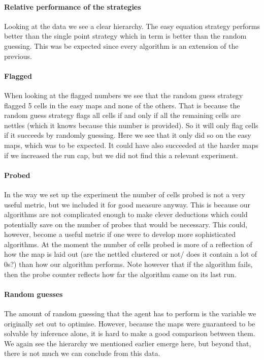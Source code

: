 \documentclass[british]{article}
\begin{document}
\paragraph{Relative performance of the strategies} Looking at the data we see a clear hierarchy. The easy equation strategy performs better than the single point strategy which in term is better than the random guessing. This was be expected since every algorithm is an extension of the previous.  

\paragraph{Flagged} When looking at the flagged numbers we see that the random guess strategy flagged 5 cells in the easy maps and none of the others. That is because the random guess strategy flags all cells if and only if all the remaining cells are nettles (which it knows because this number is provided). So it will only flag cells if it succeeds by randomly guessing. Here we see that it only did so on the easy maps, which was to be expected. It could have also succeeded at the harder maps if we increased the run cap, but we did not find this a relevant experiment.

\paragraph{Probed} In the way we set up the experiment the number of cells probed is not a very useful metric, but we included it for good measure anyway. This is because our algorithms are not complicated enough to make clever deductions which could potentially save on the number of probes that would be necessary. This could, however, become a useful metric if one were to develop more sophisticated algorithms. At the moment the number of cells probed is more of a reflection of how the map is laid out (are the nettled clustered or not/ does it contain a lot of 0s?) than how our algorithm performs. Note however that if the algorithm fails, then the probe counter reflects how far the algorithm came on its last run. 

\paragraph{Random guesses} The amount of random guessing that the agent has to perform is the variable we originally set out to optimise. However, because the maps were guaranteed to be solvable by inference alone, it is hard to make a good comparison between them. We again see the hierarchy we mentioned earlier emerge here, but beyond that, there is not much we can conclude from this data. 
\end{document}
